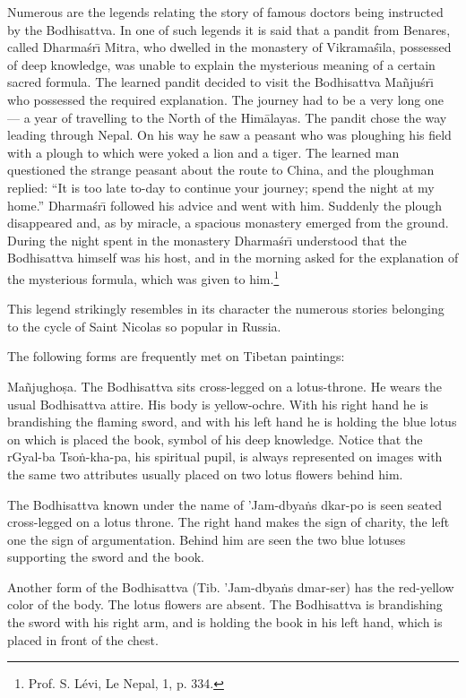 \documentclass[a4paper, 12pt, oneside]{article}
\begin{document}
Numerous are the legends relating the story of famous doctors being instructed by the Bodhisattva. In one of such legends it is said that a pandit from Benares, called Dharma\'{s}r\={\i} Mitra, who dwelled in the monastery of Vikrama\'{s}\={\i}la, possessed of deep knowledge, was unable to explain the mysterious meaning of a certain sacred formula. The learned pandit decided to visit the Bodhisattva Ma\~{n}ju\'{s}r\={\i} who possessed the required explanation. The journey had to be a very long one --- a year of travelling to the North of the Him\={a}layas. The pandit chose the way leading through Nepal. On his way he saw a peasant who was ploughing his field with a plough to which were yoked a lion and a tiger. The learned man questioned the strange peasant about the route to China, and the ploughman replied: ``It is too late to-day to continue your journey; spend the night at my home.'' Dharma\'{s}r\={\i} followed his advice and went with him. Suddenly the plough disappeared and, as by miracle, a spacious monastery emerged from the ground. During the night spent in the monastery Dharma\'{s}r\={\i} understood that the Bodhisattva himself was his host, and in the morning asked for the explanation of the mysterious formula, which was given to him.\footnote{Prof. S. Lévi, Le Nepal, 1, p. 334.}

This legend strikingly resembles in its character the numerous stories belonging to the cycle of Saint Nicolas so popular in Russia.

The following forms are frequently met on Tibetan paintings:

Ma\~{n}jugho\d{s}a. The Bodhisattva sits cross-legged on a lotus-throne. He wears the usual Bodhisattva attire. His body is yellow-ochre. With his right hand he is brandishing the flaming sword, and with his left hand he is holding the blue lotus on which is placed the book, symbol of his deep knowledge. Notice that the rGyal-ba Tso\.{n}-kha-pa, his spiritual pupil, is always represented on images with the same two attributes usually placed on two lotus flowers behind him.

The Bodhisattva known under the name of 'Jam-dbya\.{n}s dkar-po is seen seated cross-legged on a lotus throne. The right hand makes the sign of charity, the left one the sign of argumentation. Behind him are seen the two blue lotuses supporting the sword and the book.

Another form of the Bodhisattva (Tib. 'Jam-dbya\.{n}s dmar-ser) has the red-yellow color of the body. The lotus flowers are absent. The Bodhisattva is brandishing the sword with his right arm, and is holding the book in his left hand, which is placed in front of the chest.
\end{document}
